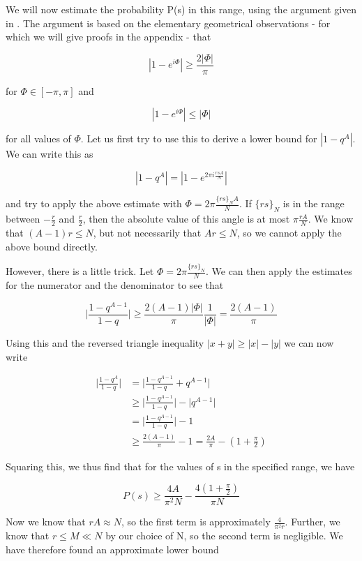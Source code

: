 \documentclass[a4paper, draft]{article}
\theoremstyle{own}
\theoremstyle{remark}
\begin{document}
We will now estimate the probability P(s) in this range, using the argument given in \cite{P}. The argument is based on the elementary geometrical observations - for which we will give proofs in the appendix - that 

$$
| 1 - e^{i\Phi}| \geq \frac{2 |\Phi|}{\pi}
$$

for $\Phi \in [-\pi,\pi]$ and 

$$
| 1 - e^{i\Phi}| \leq |\Phi|
$$

for all values of $\Phi$. Let us first try to use this to derive a lower bound for $|1 - q^A|$. We can write this as

$$
|1 - q^A| = |1 - e^{2\pi i \frac{rsA}{N}} | 
$$

and try to apply the above estimate with $\Phi = 2 \pi \frac{\{rs\}_N A}{N}$. If $\{ rs\}_N$ is in the range between $-\frac{r}{2}$ and $\frac{r}{2}$, then the absolute value of this angle is at most $\pi \frac{rA}{N}$. We know that $(A-1)r \leq N$, but not necessarily that $Ar \leq N$, so we cannot apply the above bound directly. 

However, there is a little trick. Let $\Phi = 2 \pi \frac{\{rs\}_N}{N}$. We can then apply the estimates for the numerator and the denominator to see that

$$
\big| \frac{1-q^{A-1}}{1-q} \big| \geq \frac{2 (A-1)|\Phi|}{\pi} \frac{1}{|\Phi|} = \frac{2(A-1)}{\pi} 
$$

Using this and the reversed triangle inequality $|x + y| \geq |x| - |y|$ we can now write

\begin{align*}
\big| \frac{1-q^A}{1-q} \big| &= \big| \frac{1-q^{A-1}}{1-q} + q^{A-1} \big| \\
& \geq \big| \frac{1-q^{A-1}}{1-q} \big| - \big| q^{A-1} \big | \\
&= \big| \frac{1-q^{A-1}}{1-q} \big| - 1  \\
&\geq \frac{2(A-1)}{\pi}  - 1 = \frac{2A}{\pi} - (1 + \frac{\pi}{2})
\end{align*}

Squaring this, we thus find that for the values of s in the specified range, we have

$$
P(s) \geq \frac{4A}{\pi^2 N}  - \frac{4(1+\frac{\pi}{2})}{\pi N}
$$

Now we know that $r A \approx N$, so the first term is approximately $\frac{4}{\pi^2 r}$. Further, we know that $r \leq M \ll N$ by our choice of N, so the second term is negligible. We have therefore found an approximate lower bound
\end{document}
